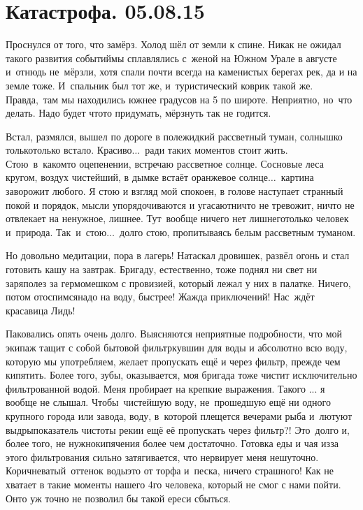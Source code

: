 \chapter{Катастрофа. 05.08.15}
\vepsianrose

Проснулся от того, что замёрз. Холод шёл от земли к спине. Никак не ожидал такого развития событий\mdash мы сплавлялись с~женой на Южном Урале в августе и~отнюдь не~мёрзли, хотя спали почти всегда на каменистых берегах рек, да и на земле тоже. И~спальник был тот же, и~туристический коврик такой же. Правда,~там мы находились южнее градусов на 5 по широте. Неприятно, но~что делать. Надо будет что\sdash то придумать, мёрзнуть так не годится. 

Встал, размялся, вышел по дороге в поле\mdash жидкий рассветный туман, солнышко только\sdash только встало. Красиво$\ldots$~ради таких моментов стоит жить. Стою~в~каком\sdash то оцепенении, встречаю рассветное солнце. Сосновые леса кругом, воздух чистейший, в дымке встаёт оранжевое солнце$\ldots$~картина заворожит любого. Я стою и взгляд мой спокоен, в голове наступает странный покой и порядок, мысли упорядочиваются и угасают\mdash ничто не тревожит, ничто не отвлекает на ненужное, лишнее. Тут~вообще ничего нет лишнего\mdash только человек и~природа. Так~и~стою$\ldots$~долго стою, пропитываясь белым рассветным туманом.

Но довольно медитации, пора в лагерь! Натаскал дровишек, развёл огонь и стал готовить кашу на завтрак. Бригаду, естественно, тоже поднял ни свет ни заря\mdash полез за гермомешком с провизией, который лежал у них в палатке. Ничего, потом отоспимся\mdash надо на воду, быстрее! Жажда приключений! Нас~ждёт красавица Лидь! 

Паковались опять очень долго. Выясняются неприятные подробности, что мой экипаж тащит с собой бытовой фильтр\sdash кувшин для воды и абсолютно всю воду, которую мы употребляем, желает пропускать ещё и через фильтр, прежде чем кипятить. Более того, зубы, оказывается, моя бригада тоже чистит исключительно фильтрованной водой. Меня пробирает на крепкие выражения. Такого ... я вообще не слышал. Чтобы~чистейшую воду, не~прошедшую ещё ни одного крупного города или завода, воду, в~которой плещется вечерами рыба и~лютуют выдры\mdash показатель чистоты реки\mdash и ещё её пропускать через фильтр?! Это~долго и, более того, не нужно\mdash кипячения более чем достаточно. Готовка еды и чая из\sdash за этого фильтрования сильно затягивается, что нервирует меня нешуточно. Коричневатый~оттенок воды\mdash это от торфа и~песка, ничего страшного! Как не хватает в такие моменты нашего 4\sdash го человека, который не смог с нами пойти. Он\sdash то уж точно не позволил бы такой ереси сбыться. 

